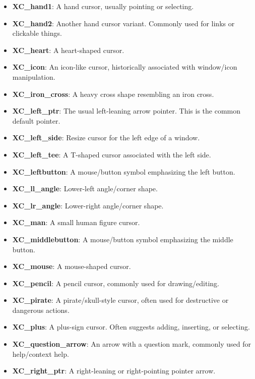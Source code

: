 \documentclass{report}
\begin{document}
\begin{itemize}
\begin{itemize}
                    \item \textbf{XC\_hand1}:	A hand cursor, usually pointing or selecting.
                    \item \textbf{XC\_hand2}:	Another hand cursor variant. Commonly used for links or clickable things.
                    \item \textbf{XC\_heart}:	A heart-shaped cursor.
                    \item \textbf{XC\_icon}:	An icon-like cursor, historically associated with window/icon manipulation.
                    \item \textbf{XC\_iron\_cross}:	A heavy cross shape resembling an iron cross.
                    \item \textbf{XC\_left\_ptr}:	The usual left-leaning arrow pointer. This is the common default pointer.
                    \item \textbf{XC\_left\_side}:	Resize cursor for the left edge of a window.
                    \item \textbf{XC\_left\_tee}:	A T-shaped cursor associated with the left side.
                    \item \textbf{XC\_leftbutton}:	A mouse/button symbol emphasizing the left button.
                    \item \textbf{XC\_ll\_angle}:	Lower-left angle/corner shape.
                    \item \textbf{XC\_lr\_angle}:	Lower-right angle/corner shape.
                    \item \textbf{XC\_man}:	A small human figure cursor.
                    \item \textbf{XC\_middlebutton}:	A mouse/button symbol emphasizing the middle button.
                    \item \textbf{XC\_mouse}:	A mouse-shaped cursor.
                    \item \textbf{XC\_pencil}:	A pencil cursor, commonly used for drawing/editing.
                    \item \textbf{XC\_pirate}:	A pirate/skull-style cursor, often used for destructive or dangerous actions.
                    \item \textbf{XC\_plus}:	A plus-sign cursor. Often suggests adding, inserting, or selecting.
                    \item \textbf{XC\_question\_arrow}:	An arrow with a question mark, commonly used for help/context help.
                    \item \textbf{XC\_right\_ptr}:	A right-leaning or right-pointing pointer arrow.

\end{itemize}
\end{itemize}
\end{document}
